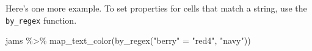 \documentclass[
]{article}
\newenvironment{Shaded}{\begin{snugshade}}{\end{snugshade}}
\newcommand{\FunctionTok}[1]{\textcolor[rgb]{0.00,0.00,0.00}{#1}}
\newcommand{\NormalTok}[1]{#1}
\newcommand{\OtherTok}[1]{\textcolor[rgb]{0.56,0.35,0.01}{#1}}
\newcommand{\SpecialCharTok}[1]{\textcolor[rgb]{0.00,0.00,0.00}{#1}}
\newcommand{\StringTok}[1]{\textcolor[rgb]{0.31,0.60,0.02}{#1}}
\begin{document}
Here's one more example. To set properties for cells that match a
string, use the \texttt{by\_regex} function.

\begin{Shaded}
\begin{Highlighting}[]
\NormalTok{jams }\SpecialCharTok{\%\textgreater{}\%} \FunctionTok{map\_text\_color}\NormalTok{(}\FunctionTok{by\_regex}\NormalTok{(}\StringTok{"berry"} \OtherTok{=} \StringTok{"red4"}\NormalTok{, }\StringTok{"navy"}\NormalTok{))}
\end{Highlighting}
\end{Shaded}

 
  \providecommand{\huxb}[2]{\arrayrulecolor[RGB]{#1}\global\arrayrulewidth=#2pt}
  \providecommand{\huxvb}[2]{\color[RGB]{#1}\vrule width #2pt}
  \providecommand{\huxtpad}[1]{\rule{0pt}{#1}}
  \providecommand{\huxbpad}[1]{\rule[-#1]{0pt}{#1}}
\end{document}
